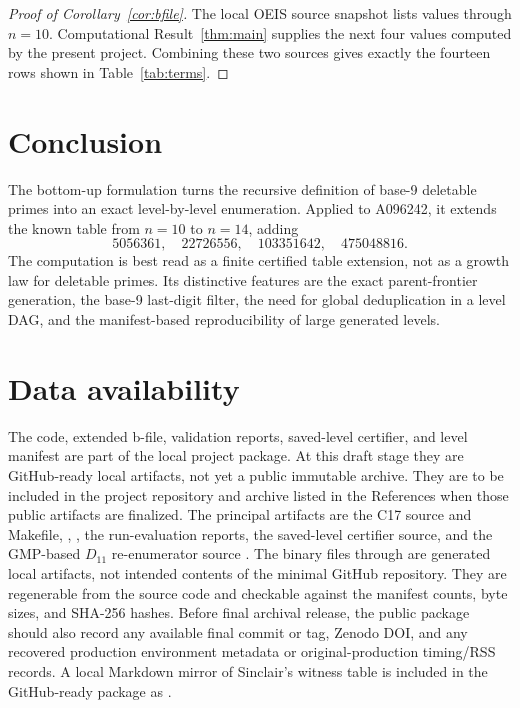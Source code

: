 \documentclass[11pt]{article}
\theoremstyle{definition}
\theoremstyle{remark}
\begin{document}
\begin{proof}[Proof of Corollary~\ref{cor:bfile}]
The local OEIS source snapshot lists values through \(n=10\).
Computational Result~\ref{thm:main} supplies the next four values computed
by the present project.  Combining these two sources gives exactly the
fourteen rows shown in Table~\ref{tab:terms}.
\end{proof}

\section{Conclusion}
\label{sec:conclusion}

The bottom-up formulation turns the recursive definition of base-9 deletable
primes into an exact level-by-level enumeration.  Applied to A096242, it
extends the known table from \(n=10\) to \(n=14\), adding
\[
  5056361,\quad 22726556,\quad 103351642,\quad 475048816.
\]
The computation is best read as a finite certified table extension, not as a
growth law for deletable primes.  Its distinctive features are the exact
parent-frontier generation, the base-9 last-digit filter, the need for
global deduplication in a level DAG, and the manifest-based reproducibility
of large generated levels.

\section*{Data availability}

The code, extended b-file, validation reports, saved-level certifier, and
level manifest are part of the local project package.  At this draft stage
they are GitHub-ready local artifacts, not yet a public immutable archive.
They are to be included in the project repository and archive listed in the
References when those public artifacts are finalized.  The principal artifacts
are the C17 source and Makefile, ,
, the run-evaluation reports, the saved-level
certifier source, and the GMP-based \(D_{11}\) re-enumerator source
.  The binary files
 through
 are generated local artifacts, not intended contents of
the minimal GitHub repository.  They are regenerable from the source code and
checkable against the manifest counts, byte sizes, and SHA-256 hashes.
Before final archival release, the public package should also record any
available final commit or tag, Zenodo DOI, and any recovered production
environment metadata or original-production timing/RSS records.  A local
Markdown mirror of Sinclair's witness table is included in the GitHub-ready
package as
.
\end{document}
